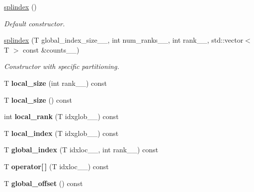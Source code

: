 \begin{DoxyCompactItemize}
\item 
\hyperlink{classsddk_1_1splindex_3_01chunk_00_01_t_01_4_a0199e0d128437a900c9fb86b6fab400c}{splindex} ()
\begin{DoxyCompactList}\small\item\em Default constructor. \end{DoxyCompactList}\item 
\hyperlink{classsddk_1_1splindex_3_01chunk_00_01_t_01_4_a89062e8d9e1659f2a33e1ea54b435ebc}{splindex} (T global\+\_\+index\+\_\+size\+\_\+\+\_\+, int num\+\_\+ranks\+\_\+\+\_\+, int rank\+\_\+\+\_\+, std\+::vector$<$ T $>$ const \&counts\+\_\+\+\_\+)
\begin{DoxyCompactList}\small\item\em Constructor with specific partitioning. \end{DoxyCompactList}\item 
\hypertarget{classsddk_1_1splindex_3_01chunk_00_01_t_01_4_aafde2f4b443aa26772c68ffaf3ff62ad}{}T {\bfseries local\+\_\+size} (int rank\+\_\+\+\_\+) const \label{classsddk_1_1splindex_3_01chunk_00_01_t_01_4_aafde2f4b443aa26772c68ffaf3ff62ad}

\item 
\hypertarget{classsddk_1_1splindex_3_01chunk_00_01_t_01_4_a7f6ffde0467cc3b7c8a46ef01b495594}{}T {\bfseries local\+\_\+size} () const \label{classsddk_1_1splindex_3_01chunk_00_01_t_01_4_a7f6ffde0467cc3b7c8a46ef01b495594}

\item 
\hypertarget{classsddk_1_1splindex_3_01chunk_00_01_t_01_4_a575eabc24f808d9ed19e5b50b4ba99b8}{}int {\bfseries local\+\_\+rank} (T idxglob\+\_\+\+\_\+) const \label{classsddk_1_1splindex_3_01chunk_00_01_t_01_4_a575eabc24f808d9ed19e5b50b4ba99b8}

\item 
\hypertarget{classsddk_1_1splindex_3_01chunk_00_01_t_01_4_a1c5b5d4109c526a89ab4c7236a7c710c}{}T {\bfseries local\+\_\+index} (T idxglob\+\_\+\+\_\+) const \label{classsddk_1_1splindex_3_01chunk_00_01_t_01_4_a1c5b5d4109c526a89ab4c7236a7c710c}

\item 
\hypertarget{classsddk_1_1splindex_3_01chunk_00_01_t_01_4_a1e15214217408c49d4083d37a98ac6ca}{}T {\bfseries global\+\_\+index} (T idxloc\+\_\+\+\_\+, int rank\+\_\+\+\_\+) const \label{classsddk_1_1splindex_3_01chunk_00_01_t_01_4_a1e15214217408c49d4083d37a98ac6ca}

\item 
\hypertarget{classsddk_1_1splindex_3_01chunk_00_01_t_01_4_a1ba3bc9a450c68925cbe1606c0e65965}{}T {\bfseries operator\mbox{[}$\,$\mbox{]}} (T idxloc\+\_\+\+\_\+) const \label{classsddk_1_1splindex_3_01chunk_00_01_t_01_4_a1ba3bc9a450c68925cbe1606c0e65965}

\item 
\hypertarget{classsddk_1_1splindex_3_01chunk_00_01_t_01_4_ae344d1b55806d75cfb4903e856d6e80d}{}T {\bfseries global\+\_\+offset} () const \label{classsddk_1_1splindex_3_01chunk_00_01_t_01_4_ae344d1b55806d75cfb4903e856d6e80d}

\end{DoxyCompactItemize}
